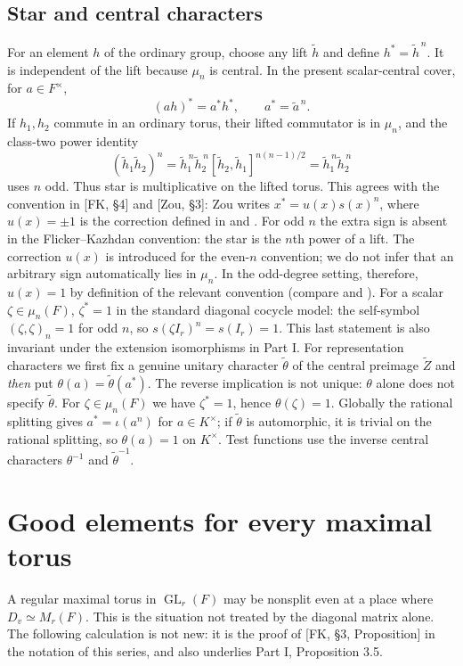 \documentclass[11pt]{article}
\newcommand{\GL}{\operatorname{GL}}
\newcommand{\tZ}{\widetilde Z}
\theoremstyle{plain}
\theoremstyle{definition}
\begin{document}
\subsection{Star and central characters}\label{subsec:star}
For an element $h$ of the ordinary group, choose any lift
$\widetilde h$ and define $h^*=\widetilde h^{\,n}$.  It is
independent of the lift because $\mu_n$ is central.  In the present
scalar-central cover, for $a\in F^\times$,
\begin{equation}\label{eq:starcentral}
 (ah)^*=a^*h^*,\qquad a^*=\widetilde a^{\,n}.
\end{equation}
If $h_1,h_2$ commute in an ordinary torus, their lifted commutator
is in $\mu_n$, and the class-two power identity
\begin{equation}\label{eq:starpower}
 (\widetilde h_1\widetilde h_2)^n
 =\widetilde h_1^{\,n}\widetilde h_2^{\,n}
 [\widetilde h_2,\widetilde h_1]^{n(n-1)/2}
 =\widetilde h_1^{\,n}\widetilde h_2^{\,n}
\end{equation}
uses $n$ odd.  Thus star is multiplicative on the lifted torus.
This agrees with the convention in [FK, \S4] and [Zou, \S3]:
Zou writes $x^*=u(x)s(x)^n$, where $u(x)=\pm1$ is the
correction defined in \cite[\S4]{FK} and \cite[\S3.1]{Zou24}.
For odd $n$ the extra sign is absent in the
Flicker--Kazhdan convention: the star is the $n$th power of a lift.
The correction $u(x)$ is introduced for the even-$n$ convention;
we do not infer that an arbitrary sign automatically lies in
$\mu_n$.  In the odd-degree setting, therefore, $u(x)=1$
by definition of the relevant convention (compare
\cite[\S4]{FK} and \cite[\S3.1]{Zou24}).  For a scalar $\zeta\in\mu_n(F)$,
$\zeta^*=1$ in the standard diagonal cocycle model: the
self-symbol $(\zeta,\zeta)_n=1$ for odd $n$, so
$s(\zeta I_r)^n=s(I_r)=1$.  This last statement is also
invariant under the extension isomorphisms in Part I.
For representation characters we first fix a genuine unitary
character $\widetilde\theta$ of the central preimage $\tZ$ and
\emph{then} put $\theta(a)=\widetilde\theta(a^*)$.
The reverse implication is not unique: $\theta$ alone does not
specify $\widetilde\theta$.  For $\zeta\in\mu_n(F)$ we have
$\zeta^*=1$, hence $\theta(\zeta)=1$.  Globally the rational
splitting gives $a^*=\iota(a^n)$ for $a\in K^\times$;
if $\widetilde\theta$ is automorphic, it is trivial on the rational
splitting, so $\theta(a)=1$ on $K^\times$.
Test functions use the inverse central characters
$\theta^{-1}$ and $\widetilde\theta^{-1}$.

\section{Good elements for every maximal torus}\label{sec:good}
A regular maximal torus in $\GL_r(F)$ may be nonsplit even at a
place where $D_v\simeq M_r(F)$.  This is the situation not treated by
the diagonal matrix alone.  The following calculation is not new:
it is the proof of [FK, \S3, Proposition] in the notation of this
series, and also underlies Part I, Proposition 3.5.
\end{document}
